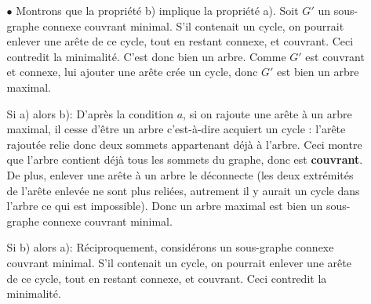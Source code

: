 \begin{exo}
\begin{sol}
\begin{enumerate}
\begin{itemize}
$\bullet$ Montrons que la propriété b) implique la propriété a). Soit $G'$ un sous-graphe connexe couvrant minimal. S'il contenait un cycle, on pourrait enlever une arête de ce cycle, tout en restant connexe, et couvrant. Ceci contredit la minimalité. C'est donc bien un arbre. Comme $G'$ est couvrant et connexe, lui ajouter une arête crée un cycle, donc $G'$ est bien un arbre maximal.


\item[Si a) alors b): ] D'après la condition $a$, si on rajoute une arête à un arbre maximal, il cesse d'être un arbre c'est-à-dire acquiert un cycle : l'arête rajoutée relie donc deux sommets appartenant déjà à l'arbre. Ceci montre que l'arbre contient déjà tous les sommets du graphe, donc est \textbf{couvrant}. De plus, enlever une arête  à un arbre le déconnecte (les deux extrémités de l'arête enlevée ne sont plus reliées, autrement il y aurait un cycle dans l'arbre ce qui est impossible). Donc un arbre maximal est bien un sous-graphe connexe couvrant minimal.
\item[Si b) alors a): ] Réciproquement, considérons un sous-graphe connexe couvrant minimal. S'il contenait un cycle, on pourrait enlever une arête de ce cycle, tout en restant connexe, et couvrant. Ceci contredit la minimalité. 
\end{itemize}


\end{enumerate}
\end{sol}
\end{exo}
